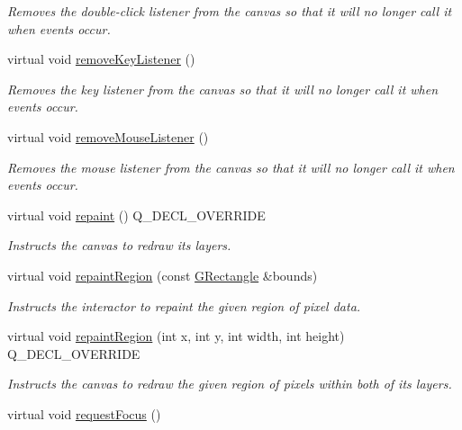 \begin{DoxyCompactItemize}
\begin{DoxyCompactList}\small\item\em Removes the double-\/click listener from the canvas so that it will no longer call it when events occur. \end{DoxyCompactList}\item 
virtual void \mbox{\hyperlink{classGCanvas_a43095f41cab3be732b49f29970484b05}{remove\+Key\+Listener}} ()
\begin{DoxyCompactList}\small\item\em Removes the key listener from the canvas so that it will no longer call it when events occur. \end{DoxyCompactList}\item 
virtual void \mbox{\hyperlink{classGCanvas_aff47f71ce47e688a07c9d38dc92fcc11}{remove\+Mouse\+Listener}} ()
\begin{DoxyCompactList}\small\item\em Removes the mouse listener from the canvas so that it will no longer call it when events occur. \end{DoxyCompactList}\item 
virtual void \mbox{\hyperlink{classGCanvas_ab93427f61c64e3db7f2637519aed1c00}{repaint}} () Q\+\_\+\+D\+E\+C\+L\+\_\+\+O\+V\+E\+R\+R\+I\+DE
\begin{DoxyCompactList}\small\item\em Instructs the canvas to redraw its layers. \end{DoxyCompactList}\item 
virtual void \mbox{\hyperlink{classGDrawingSurface_a769c46fb3e1004aec76e8b0adfa42aa6}{repaint\+Region}} (const \mbox{\hyperlink{classGRectangle}{G\+Rectangle}} \&bounds)
\begin{DoxyCompactList}\small\item\em Instructs the interactor to repaint the given region of pixel data. \end{DoxyCompactList}\item 
virtual void \mbox{\hyperlink{classGCanvas_a52152a764c4c4b092f826eee5d6554aa}{repaint\+Region}} (int x, int y, int width, int height) Q\+\_\+\+D\+E\+C\+L\+\_\+\+O\+V\+E\+R\+R\+I\+DE
\begin{DoxyCompactList}\small\item\em Instructs the canvas to redraw the given region of pixels within both of its layers. \end{DoxyCompactList}\item 
virtual void \mbox{\hyperlink{classGInteractor_a519fb2ac767f8b2febbb50b898b8c8cb}{request\+Focus}} ()

\end{DoxyCompactItemize}
